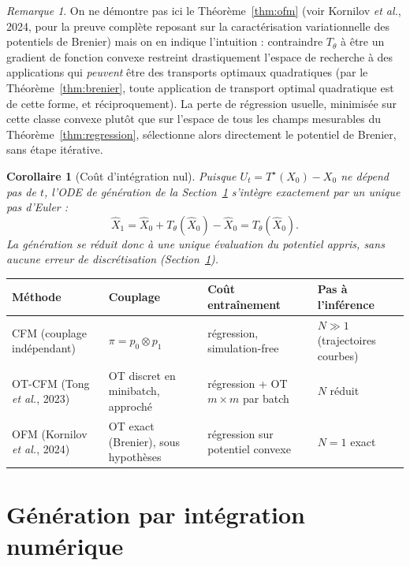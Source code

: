 \documentclass[11pt,a4paper]{article}
\theoremstyle{definition}
\theoremstyle{plain}
\newtheorem{corollaire}{Corollaire}[section]
\theoremstyle{remark}
\newtheorem{remark}{Remarque}[section]
\begin{document}
\begin{remark}
On ne démontre pas ici le Théorème~\ref{thm:ofm} (voir Kornilov \emph{et al.},
2024, pour la preuve complète reposant sur la caractérisation variationnelle des
potentiels de Brenier) mais on en indique l'intuition : contraindre $T_\theta$ à
être un gradient de fonction convexe restreint drastiquement l'espace de
recherche à des applications qui \emph{peuvent} être des transports optimaux
quadratiques (par le Théorème~\ref{thm:brenier}, toute application de transport
optimal quadratique est de cette forme, et réciproquement). La perte de
régression usuelle, minimisée sur cette classe convexe plutôt que sur l'espace
de tous les champs mesurables du Théorème~\ref{thm:regression}, sélectionne
alors directement le potentiel de Brenier, sans étape itérative.
\end{remark}

\begin{corollaire}[Coût d'intégration nul]
Puisque $U_t=T^\star(X_0)-X_0$ ne dépend pas de $t$, l'ODE de génération de la
Section~\ref{sec:integration-numerique} s'intègre exactement par un unique pas d'Euler :
\[
  \widehat X_1 = \widehat X_0 + T_\theta(\widehat X_0) - \widehat X_0 = T_\theta(\widehat X_0).
\]
La génération se réduit donc à une unique évaluation du potentiel appris, sans
aucune erreur de discrétisation (Section~\ref{sec:integration-numerique}).
\end{corollaire}

\begin{center}
\small
\renewcommand{\arraystretch}{1.4}
\begin{tabular}{@{}p{2.8cm}p{4.0cm}p{3.8cm}p{2.7cm}@{}}
\toprule
\textbf{Méthode} & \textbf{Couplage} & \textbf{Coût entraînement} & \textbf{Pas à l'inférence} \\
\midrule
CFM (couplage indépendant) & $\pi=p_0\otimes p_1$ & régression, simulation-free & $N\gg 1$ (trajectoires courbes) \\
OT-CFM (Tong \emph{et al.}, 2023) & OT discret en minibatch, approché & régression + OT $m\times m$ par batch & $N$ réduit \\
OFM (Kornilov \emph{et al.}, 2024) & OT exact (Brenier), sous hypothèses & régression sur potentiel convexe & $N=1$ exact \\
\bottomrule
\end{tabular}
\end{center}

\section{Génération par intégration numérique}\label{sec:integration-numerique}
\end{document}
